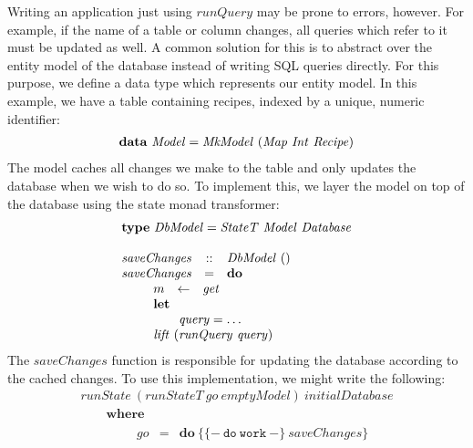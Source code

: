 Writing an application just using $\mathit{runQuery}$ may be prone to errors, however. For example, if the name of a table or column changes, all queries which refer to it must be updated as well. A common solution for this is to abstract over the entity model of the database instead of writing SQL queries directly. For this purpose, we define a data type which represents our entity model. In this example, we have a table containing recipes, indexed by a unique, numeric identifier:
\begin{displaymath}
\begin{array}{lcl}
\multicolumn{3}{l}{\mathbf{data}~\mathit{Model} = \mathit{MkModel}~(\mathit{Map}~\mathit{Int}~\mathit{Recipe})}
\end{array}
\end{displaymath}
The model caches all changes we make to the table and only updates the database when we wish to do so. To implement this, we layer the model on top of the database using the state monad transformer:
\begin{displaymath}
\begin{array}{lcl}
\multicolumn{3}{l}{\mathbf{type}~\mathit{DbModel} = \mathit{StateT}~\mathit{Model}~\mathit{Database}}\\\\
\mathit{saveChanges} & :: & \mathit{DbModel}~() \\
\mathit{saveChanges} & = & \mathbf{do} \\
\multicolumn{3}{l}{\qquad \begin{array}{lcl}
    m & \leftarrow & \mathit{get} \\
    \multicolumn{3}{l}{\mathbf{let}} \\
    \multicolumn{3}{l}{\qquad \mathit{query} = \ldots} \\
    \multicolumn{3}{l}{\mathit{lift}~(\mathit{runQuery}~\mathit{query})}
\end{array} }
\end{array}
\end{displaymath}
The $\mathit{saveChanges}$ function is responsible for updating the database according to the cached changes. To use this implementation, we might write the following:
\begin{displaymath}
\begin{array}{l}
\mathit{runState}~(\mathit{runStateT}~\mathit{go}~\mathit{emptyModel})~\mathit{initialDatabase} \\
\qquad \mathbf{where} \\
\qquad \qquad \begin{array}{lcl}
\mathit{go} & = & \mathbf{do}~\{ \mathtt{\{-~do~work~-\}}~\mathit{saveChanges} \}
\end{array}
\end{array}
\end{displaymath}
